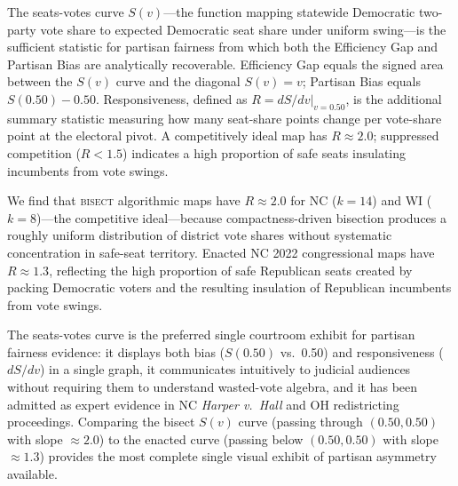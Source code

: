 The seats-votes curve $S(v)$---the function mapping statewide Democratic two-party vote share
to expected Democratic seat share under uniform swing---is the sufficient statistic for partisan
fairness from which both the Efficiency Gap and Partisan Bias are analytically recoverable.
Efficiency Gap equals the signed area between the $S(v)$ curve and the diagonal $S(v) = v$;
Partisan Bias equals $S(0.50) - 0.50$. Responsiveness, defined as $R = dS/dv|_{v=0.50}$,
is the additional summary statistic measuring how many seat-share points change per vote-share
point at the electoral pivot. A competitively ideal map has $R \approx 2.0$; suppressed
competition ($R < 1.5$) indicates a high proportion of safe seats insulating incumbents
from vote swings.

We find that \textsc{bisect} algorithmic maps have $R \approx 2.0$ for NC ($k=14$) and
WI ($k=8$)---the competitive ideal---because compactness-driven bisection produces a roughly
uniform distribution of district vote shares without systematic concentration in safe-seat
territory. Enacted NC 2022 congressional maps have $R \approx 1.3$, reflecting the high
proportion of safe Republican seats created by packing Democratic voters and the resulting
insulation of Republican incumbents from vote swings.

The seats-votes curve is the preferred single courtroom exhibit for partisan fairness evidence:
it displays both bias ($S(0.50)$ vs.\ 0.50) and responsiveness ($dS/dv$) in a single graph,
it communicates intuitively to judicial audiences without requiring them to understand
wasted-vote algebra, and it has been admitted as expert evidence in NC \textit{Harper v.\ Hall}
and OH redistricting proceedings. Comparing the bisect $S(v)$ curve (passing through $(0.50, 0.50)$
with slope $\approx 2.0$) to the enacted curve (passing below $(0.50, 0.50)$ with slope $\approx 1.3$)
provides the most complete single visual exhibit of partisan asymmetry available.

